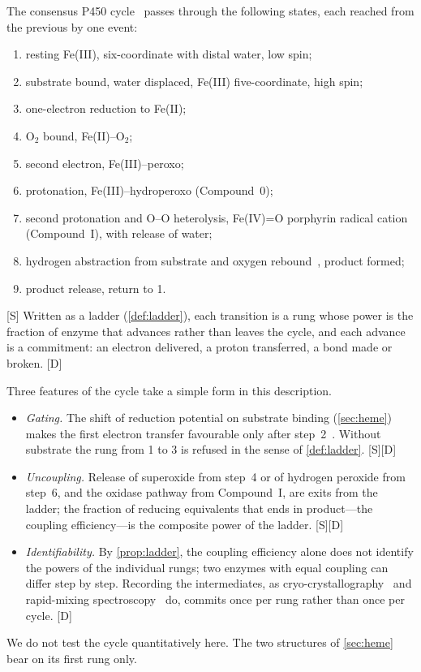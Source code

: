 \documentclass[10pt,twocolumn,a4paper]{article}
\newcommand{\D}{\textsf{[D]}}
\newcommand{\Sup}{\textsf{[S]}}
\begin{document}
The consensus P450 cycle~\citep{denisov2005,poulos2014} passes through the
following states, each reached from the previous by one event:
\begin{enumerate}[label=\arabic*.,nosep]
\item resting Fe(III), six-coordinate with distal water, low spin;
\item substrate bound, water displaced, Fe(III) five-coordinate, high spin;
\item one-electron reduction to Fe(II);
\item O$_2$ bound, Fe(II)--O$_2$;
\item second electron, Fe(III)--peroxo;
\item protonation, Fe(III)--hydroperoxo (Compound~0);
\item second protonation and O--O heterolysis, Fe(IV)=O porphyrin radical
      cation (Compound~I), with release of water;
\item hydrogen abstraction from substrate and oxygen rebound~\citep{groves1976},
      product formed;
\item product release, return to 1.
\end{enumerate}
\Sup{} Written as a ladder (\cref{def:ladder}), each transition is a rung
whose power is the fraction of enzyme that advances rather than leaves the
cycle, and each advance is a commitment: an electron delivered, a proton
transferred, a bond made or broken. \D

Three features of the cycle take a simple form in this description.
\begin{itemize}[nosep]
\item \emph{Gating.} The shift of reduction potential on substrate binding
      (\cref{sec:heme}) makes the first electron transfer favourable only
      after step~2~\citep{sligar1976}. Without substrate the rung from 1 to 3
      is refused in the sense of \cref{def:ladder}. \Sup\D
\item \emph{Uncoupling.} Release of superoxide from step~4 or of hydrogen
      peroxide from step~6, and the oxidase pathway from Compound~I, are
      exits from the ladder; the fraction of reducing equivalents that ends
      in product---the coupling efficiency---is the composite power of the
      ladder. \Sup\D
\item \emph{Identifiability.} By \cref{prop:ladder}, the coupling efficiency
      alone does not identify the powers of the individual rungs; two enzymes
      with equal coupling can differ step by step. Recording the
      intermediates, as cryo-crystallography~\citep{schlichting2000} and
      rapid-mixing spectroscopy~\citep{rittle2010} do, commits once per rung
      rather than once per cycle. \D
\end{itemize}
We do not test the cycle quantitatively here. The two structures of
\cref{sec:heme} bear on its first rung only.
\end{document}
